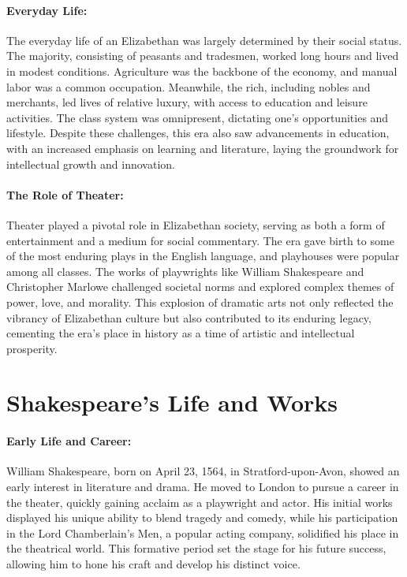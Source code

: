 \documentclass[a4paper,12pt]{book}
\begin{document}
\paragraph{Everyday Life:}
The everyday life of an Elizabethan was largely determined by their social status. The majority, consisting of peasants and tradesmen, worked long hours and lived in modest conditions. Agriculture was the backbone of the economy, and manual labor was a common occupation. Meanwhile, the rich, including nobles and merchants, led lives of relative luxury, with access to education and leisure activities. The class system was omnipresent, dictating one’s opportunities and lifestyle. Despite these challenges, this era also saw advancements in education, with an increased emphasis on learning and literature, laying the groundwork for intellectual growth and innovation.

\paragraph{The Role of Theater:}
Theater played a pivotal role in Elizabethan society, serving as both a form of entertainment and a medium for social commentary. The era gave birth to some of the most enduring plays in the English language, and playhouses were popular among all classes. The works of playwrights like William Shakespeare and Christopher Marlowe challenged societal norms and explored complex themes of power, love, and morality. This explosion of dramatic arts not only reflected the vibrancy of Elizabethan culture but also contributed to its enduring legacy, cementing the era’s place in history as a time of artistic and intellectual prosperity.

\section*{Shakespeare’s Life and Works}

\paragraph{Early Life and Career:}
William Shakespeare, born on April 23, 1564, in Stratford-upon-Avon, showed an early interest in literature and drama. He moved to London to pursue a career in the theater, quickly gaining acclaim as a playwright and actor. His initial works displayed his unique ability to blend tragedy and comedy, while his participation in the Lord Chamberlain's Men, a popular acting company, solidified his place in the theatrical world. This formative period set the stage for his future success, allowing him to hone his craft and develop his distinct voice.
\end{document}
